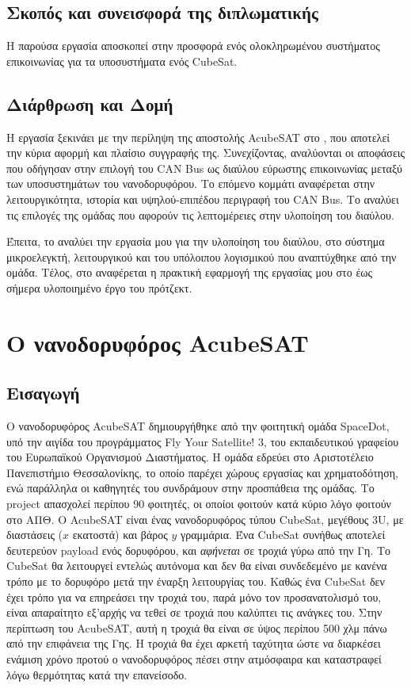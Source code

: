 \documentclass[a4paper,nobib,justified]{tufte-book}
\begin{document}
\section{Σκοπός και συνεισφορά της διπλωματικής}
Η παρούσα εργασία αποσκοπεί στην προσφορά ενός ολοκληρωμένου συστήματος επικοινωνίας για τα υποσυστήματα ενός CubeSat.  

\section{Διάρθρωση και Δομή}
Η εργασία ξεκινάει με την περίληψη της αποστολής AcubeSAT στο , που αποτελεί την κύρια αφορμή και πλαίσιο συγγραφής της. Συνεχίζοντας, αναλύονται οι αποφάσεις που οδήγησαν στην επιλογή του CAN Bus ως διαύλου εύρωστης επικοινωνίας μεταξύ των υποσυστημάτων του νανοδορυφόρου. Το επόμενο κομμάτι αναφέρεται στην λειτουργικότητα, ιστορία και υψηλού-επιπέδου περιγραφή του CAN Bus. Το  αναλύει τις επιλογές της ομάδας που αφορούν τις λεπτομέρειες στην υλοποίηση του διαύλου.

\par Έπειτα, το  αναλύει την εργασία μου για την υλοποίηση του διαύλου, στο σύστημα μικροελεγκτή, λειτουργικού και του υπόλοιπου λογισμικού που αναπτύχθηκε από την ομάδα. Τέλος, στο  αναφέρεται η πρακτική εφαρμογή της εργασίας μου στο έως σήμερα υλοποιημένο έργο του πρότζεκτ.

\chapter{Ο νανοδορυφόρος AcubeSAT}
\label{acubesat}
\section{Εισαγωγή}
Ο νανοδορυφόρος AcubeSAT δημιουργήθηκε από την φοιτητική ομάδα SpaceDot, υπό την αιγίδα του προγράμματος Fly Your Satellite! 3, του εκπαιδευτικού γραφείου του Ευρωπαϊκού Οργανισμού Διαστήματος. Η ομάδα εδρεύει στο Αριστοτέλειο Πανεπιστήμιο Θεσσαλονίκης, το οποίο παρέχει χώρους εργασίας και χρηματοδότηση, ενώ παράλληλα οι καθηγητές του συνδράμουν στην προσπάθεια της ομάδας. Το project απασχολεί περίπου 90 φοιτητές, οι οποίοι φοιτούν κατά κύριο λόγο φοιτούν στο ΑΠΘ. Ο AcubeSAT είναι ένας νανοδορυφόρος τύπου CubeSat, μεγέθους 3U, με διαστάσεις ($x$ εκατοστά) και βάρος $y$ γραμμάρια. Ένα CubeSat συνήθως αποτελεί δευτερεύον payload ενός δορυφόρου, και \emph{αφήνεται} σε τροχιά γύρω από την Γη. Το CubeSat θα λειτουργεί εντελώς αυτόνομα και δεν θα είναι συνδεδεμένο με κανένα τρόπο με το δορυφόρο μετά την έναρξη λειτουργίας του. Καθώς ένα CubeSat δεν έχει τρόπο για να επηρεάσει την τροχιά του, παρά μόνο τον προσανατολισμό του, είναι απαραίτητο εξ'αρχής να τεθεί σε τροχιά που καλύπτει τις ανάγκες του. Στην περίπτωση του AcubeSAT, αυτή η τροχιά θα είναι σε ύψος περίπου 500 χλμ πάνω από την επιφάνεια της Γης. Η τροχιά θα έχει αρκετή ταχύτητα ώστε να διαρκέσει ενάμιση χρόνο προτού ο νανοδορυφόρος πέσει στην ατμόσφαιρα και καταστραφεί λόγω θερμότητας κατά την επανείσοδο.
\end{document}
